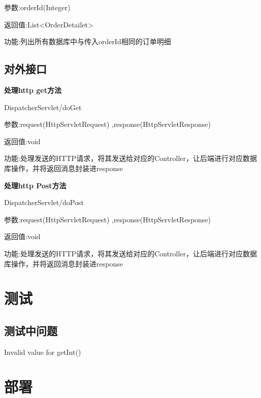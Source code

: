 参数:orderId(Integer) 

返回值:List<OrderDetailet>

功能:列出所有数据库中与传入orderId相同的订单明细

\subsection{对外接口}
\textbf{处理http get方法}

DispatcherServlet/doGet

参数:request(HttpServletRequest) ,response(HttpServletResponse)

返回值:void

功能:处理发送的HTTP请求，将其发送给对应的Controller，让后端进行对应数据库操作，并将返回消息封装进response

\textbf{处理http Post方法}

DispatcherServlet/doPost

参数:request(HttpServletRequest) ,response(HttpServletResponse)

返回值:void

功能:处理发送的HTTP请求，将其发送给对应的Controller，让后端进行对应数据库操作，并将返回消息封装进response

\section{测试}
\subsection{测试中问题}
Invalid value for getInt()
\section{部署}